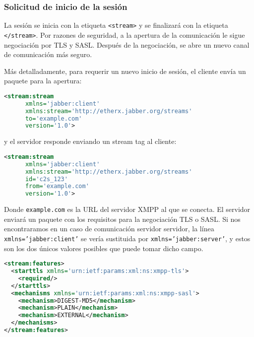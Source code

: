 \documentclass[a4paper, 11pt]{article} %
\begin{document}
    \subsubsection{Solicitud de inicio de la sesión}
      La sesión se inicia con la etiqueta \texttt{<stream>} y se finalizará con la etiqueta
      \texttt{</stream>}. Por razones de seguridad, a la apertura de la comunicación le sigue
      negociación por TLS y SASL. Después de la negociación, se abre un nuevo canal de comunicación
      más seguro.
      
      Más detalladamente, para requerir un nuevo inicio de sesión, el cliente envía un paquete para la apertura:
      \begin{lstlisting}[language=XML] 
<stream:stream 
	  xmlns='jabber:client'
	  xmlns:stream='http://etherx.jabber.org/streams'
	  to='example.com' 
	  version='1.0'>
      \end{lstlisting}
      y el servidor responde enviando un stream tag al cliente:
      \begin{lstlisting}[language=XML] 
<stream:stream
	  xmlns='jabber:client'
	  xmlns:stream='http://etherx.jabber.org/streams'
	  id='c2s_123'
	  from='example.com'
	  version='1.0'>
      \end{lstlisting}    
      Donde \texttt{example.com} es la URL del servidor XMPP al que se conecta. El servidor
      enviará un paquete con los requisitos para la negociación TLS o SASL. Si nos encontraramos en un caso de 
      comunicación servidor servidor, la línea \texttt{xmlns='jabber:client'} se vería sustituida por 
      \texttt{xmlns='jabber:server'}, y estos son los dos únicos valores posibles que puede tomar dicho campo.
      \begin{lstlisting}[language=XML]
<stream:features> 
  <starttls xmlns='urn:ietf:params:xml:ns:xmpp-tls'>    
    <required/>  
  </starttls>  
  <mechanisms xmlns='urn:ietf:params:xml:ns:xmpp-sasl'>    
    <mechanism>DIGEST-MD5</mechanism>    
    <mechanism>PLAIN</mechanism>   
    <mechanism>EXTERNAL</mechanism>  
  </mechanisms> 
</stream:features>
      \end{lstlisting}
\end{document}

